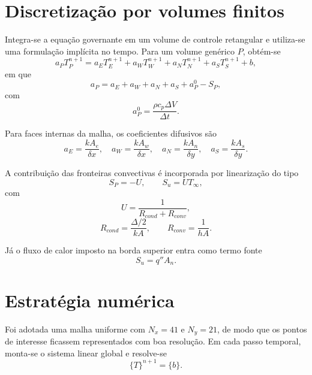 \documentclass[12pt,a4paper]{article}
\begin{document}
\section{Discretização por volumes finitos}
Integra-se a equação governante em um volume de controle retangular e utiliza-se uma formulação implícita no tempo. Para um volume genérico $P$, obtém-se
\begin{equation}
a_P T_P^{n+1} = a_E T_E^{n+1} + a_W T_W^{n+1} + a_N T_N^{n+1} + a_S T_S^{n+1} + b,
\end{equation}
em que
\begin{equation}
a_P = a_E + a_W + a_N + a_S + a_P^0 - S_P,
\end{equation}
com
\begin{equation}
a_P^0 = \frac{\rho c_p \Delta V}{\Delta t}.
\end{equation}

Para faces internas da malha, os coeficientes difusivos são
\begin{equation}
a_E = \frac{kA_e}{\delta x},\quad
 a_W = \frac{kA_w}{\delta x},\quad
 a_N = \frac{kA_n}{\delta y},\quad
 a_S = \frac{kA_s}{\delta y}.
\end{equation}

A contribuição das fronteiras convectivas é incorporada por linearização do tipo
\begin{equation}
S_P = -U,\qquad S_u = UT_{\infty},
\end{equation}
com
\begin{equation}
U = \frac{1}{R_{cond}+R_{conv}},
\end{equation}
\begin{equation}
R_{cond}=\frac{\Delta/2}{kA},\qquad R_{conv}=\frac{1}{hA}.
\end{equation}

Já o fluxo de calor imposto na borda superior entra como termo fonte
\begin{equation}
S_u = q''A_n.
\end{equation}

\section{Estratégia numérica}
Foi adotada uma malha uniforme com $N_x=41$ e $N_y=21$, de modo que os pontos de interesse ficassem representados com boa resolução. Em cada passo temporal, monta-se o sistema linear global e resolve-se
\begin{equation}
[A]\{T\}^{n+1}=\{b\}.
\end{equation}
\end{document}
